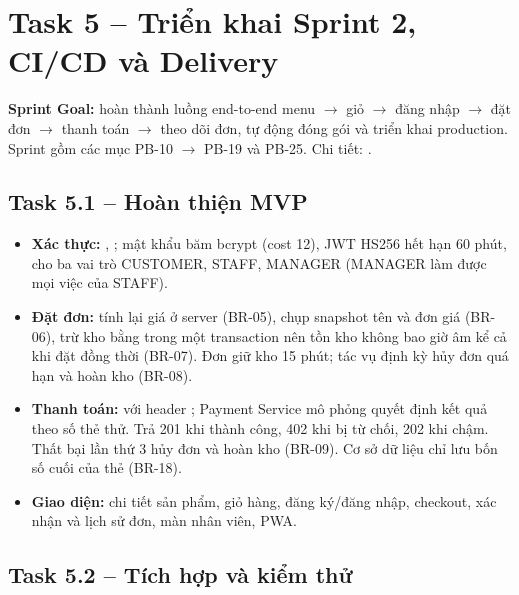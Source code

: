 \section{Task 5 -- Triển khai Sprint 2, CI/CD và Delivery}\label{sec:sprint2}

\textbf{Sprint Goal:} hoàn thành luồng end-to-end menu $\rightarrow$ giỏ $\rightarrow$ đăng nhập $\rightarrow$ đặt đơn
$\rightarrow$ thanh toán $\rightarrow$ theo dõi đơn, tự động đóng gói và triển khai production. Sprint gồm các mục
PB-10 $\rightarrow$ PB-19 và PB-25. Chi tiết: .

\subsection{Task 5.1 -- Hoàn thiện MVP}

\begin{itemize}
  \item \textbf{Xác thực:} , ; mật khẩu băm bcrypt (cost 12), JWT HS256 hết hạn
        60 phút,  cho ba vai trò CUSTOMER, STAFF, MANAGER (MANAGER làm được mọi việc của STAFF).
  \item \textbf{Đặt đơn:}  tính lại giá ở server (BR-05), chụp snapshot tên và đơn giá (BR-06), trừ kho bằng
         trong một transaction nên tồn kho không bao giờ âm kể cả khi đặt đồng thời (BR-07).
        Đơn giữ kho 15 phút; tác vụ định kỳ hủy đơn quá hạn và hoàn kho (BR-08).
  \item \textbf{Thanh toán:}  với header ; Payment Service mô phỏng quyết định kết quả theo số thẻ thử.
        Trả 201 khi thành công, 402 khi bị từ chối, 202 khi chậm. Thất bại lần thứ 3 hủy đơn và hoàn kho (BR-09).
        Cơ sở dữ liệu chỉ lưu bốn số cuối của thẻ (BR-18).
  \item \textbf{Giao diện:} chi tiết sản phẩm, giỏ hàng, đăng ký/đăng nhập, checkout, xác nhận và lịch sử đơn, màn nhân viên, PWA.
\end{itemize}

\subsection{Task 5.2 -- Tích hợp và kiểm thử}

